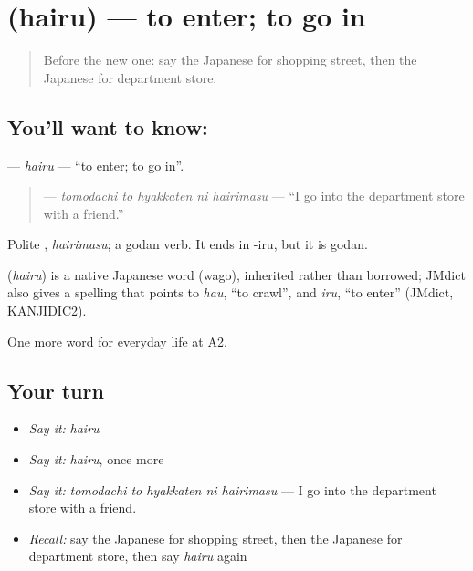 \section[\texorpdfstring{\ja{はいる} (hairu)}{はいる (hairu)}]{ (hairu) — to enter; to go in}

\label{lesson:JA-C190-hairu}



\begin{quote}
Before the new one: say the Japanese for shopping street, then the Japanese for department store.
\end{quote}

\subsection*{You'll want to know: }
\textbf{} — \emph{hairu} — \textquotedblleft{}to enter; to go in\textquotedblright{}.

\begin{quote}
\textbf{  } — \emph{tomodachi to hyakkaten ni hairimasu} — \textquotedblleft{}I go into the department store with a friend.\textquotedblright{}
\end{quote}

Polite \textbf{}, \emph{hairimasu}; a godan verb. It ends in -iru, but it is godan.

\begin{cousinweb}
\textbf{} (\emph{hairu}) is a native Japanese word (wago), inherited rather than borrowed; JMdict also gives a spelling that points to \emph{hau}, \textquotedblleft{}to crawl\textquotedblright{}, and \emph{iru}, \textquotedblleft{}to enter\textquotedblright{} (JMdict, KANJIDIC2).
\end{cousinweb}

\begin{grammarlens}[title={What you've built}]
One more word for everyday life at A2.
\end{grammarlens}

\subsection*{Your turn}
\begin{itemize}
\raggedright
  \item \emph{Say it:} \emph{hairu}
  \item \emph{Say it:} \emph{hairu}, once more
  \item \emph{Say it:} \emph{tomodachi to hyakkaten ni hairimasu} — I go into the department store with a friend.
  \item \emph{Recall:} say the Japanese for shopping street, then the Japanese for department store, then say \emph{hairu} again
\end{itemize}

